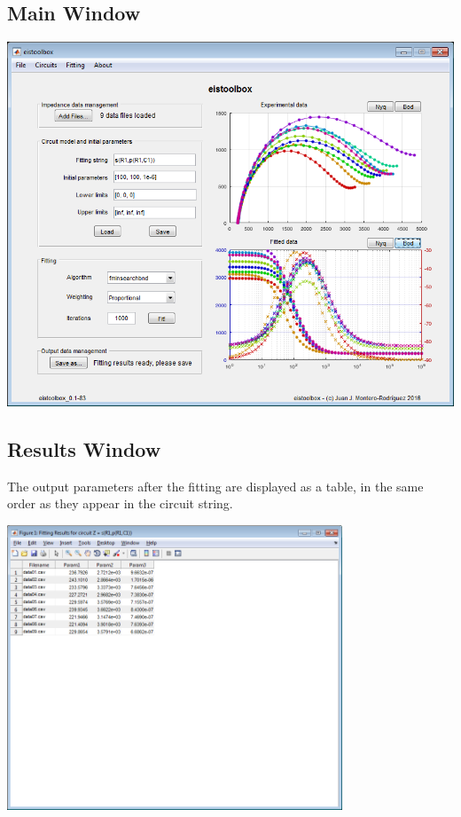 \documentclass[10pt,a4paper,oneside]{book}
\begin{document}
\subsection{Main Window}

\includegraphics[width=15cm]{main_screenshot.png}

\subsection{Results Window}

The output parameters after the fitting are displayed as a table, in the same order as they appear in the circuit string.

\includegraphics[width=10cm]{scr_results.png}
\end{document}
